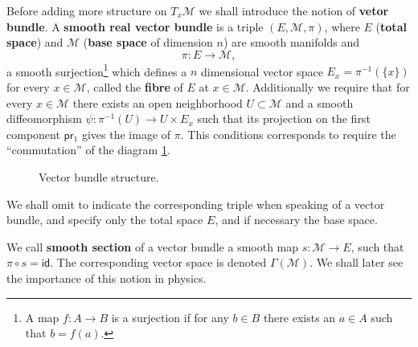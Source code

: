 \documentclass[11pt]{book}
\newcommand{\id}{\mathsf{id}}
\newcommand{\Mcal}{\mathcal{M}}
\newcommand{\psf}{\mathsf{p}}
\newcommand{\rsf}{\mathsf{r}}
\theoremstyle{break}
\begin{document}
Before adding more structure on $T_x \Mcal$ we shall introduce the notion of \textbf{vetor bundle}. A \textbf{smooth real vector bundle} is a triple $(E,\Mcal,\pi)$, where $E$ (\textbf{total space}) and $\Mcal$ (\textbf{base space} of dimension $n$) are smooth manifolds and 
%
\begin{equation*}
\pi : E \to \Mcal , 
\end{equation*}
%
a smooth surjection\footnote{A map $f : A \to B$ is a surjection if for any $b \in B$ there exists an $a\in A$ such that $b=f(a)$.} which defines a $n$ dimensional vector space $E_x = \pi^{-1}(\{x\})$ for every $x \in \Mcal$, called the \textbf{fibre} of $E$ at $x\in\Mcal$. Additionally we require that for every $x\in\Mcal$ there exists an open neighborhood $U \subset \Mcal$ and a smooth diffeomorphism $\psi : \pi^{-1}(U) \to U \times E_x$ such that its projection on the first component $\psf\rsf_1$ gives the image of $\pi$. This conditions corresponds to require the ``commutation'' of the diagram \ref{fig:vect_bund_strut}.


\begin{figure}[ht!]
\begin{center}
\end{center}
\caption{Vector bundle structure.}
\label{fig:vect_bund_strut}
\end{figure}


We shall omit to indicate the corresponding triple when speaking of a vector bundle, and specify only the total space $E$, and if necessary the base space.




We call \textbf{smooth section} of a vector bundle a smooth map $s : \Mcal \to E$, such that $\pi \circ s = \id$. The corresponding vector space is denoted $\Gamma(\Mcal)$. We shall later see the importance of this notion in physics.
\end{document}
